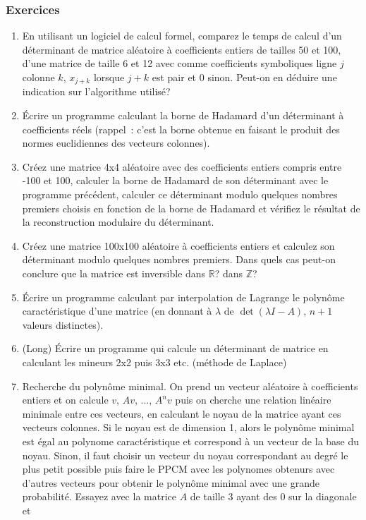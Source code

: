 \documentclass[a4paper,11pt]{article}
\newcommand{\R}{{\mathbb{R}}}
\newcommand{\Z}{{\mathbb{Z}}}
\begin{document}
\subsubsection{Exercices}
\begin{enumerate}
\item En utilisant un logiciel de calcul formel,
comparez le temps de calcul d'un d\'eterminant de matrice
al\'eatoire \`a coefficients entiers de tailles 50 et 100, 
d'une matrice de taille 6 et 12 avec comme coefficients symboliques
ligne $j$ colonne $k$, $x_{j+k}$ lorsque $j+k$ est pair
et 0 sinon. Peut-on en déduire une indication sur l'algorithme
utilisé?
\item \'Ecrire un programme calculant la borne de Hadamard d'un
déterminant à coefficients réels (rappel~: c'est la borne obtenue en faisant
le produit des normes euclidiennes des vecteurs colonnes).
\item Créez une matrice 4x4 aléatoire avec des coefficients entiers
compris entre -100 et 100, calculer la borne de Hadamard de son déterminant
avec le programme précédent, calculer ce déterminant modulo
quelques nombres premiers choisis en fonction de la borne de Hadamard
et vérifiez le résultat de la reconstruction modulaire du déterminant.
\item Créez une matrice 100x100 aléatoire à coefficients entiers
et calculez son déterminant
modulo quelques nombres premiers. Dans quels cas peut-on
conclure que la matrice est inversible dans $\R$? dans $\Z$?
\item \'Ecrire un programme calculant par interpolation de Lagrange
le polyn\^ome caract\'eristique d'une matrice (en donnant \`a $\lambda$
de $\det(\lambda I -A)$, $n+1$ valeurs distinctes).
\item (Long) \'Ecrire un programme qui calcule un d\'eterminant de matrice
en calculant les mineurs 2x2 puis 3x3 etc. (m\'ethode de Laplace)
\item Recherche du polynôme minimal. On prend un vecteur aléatoire
à coefficients entiers et on calcule $v$, $Av$, ..., $A^nv$ puis
on cherche une relation linéaire minimale entre ces vecteurs, en
calculant le noyau de la matrice ayant ces vecteurs colonnes. Si le
noyau est de dimension 1, alors le polynôme minimal est égal au
polynome caractéristique et correspond à un vecteur de la base du noyau.
Sinon, il faut choisir un vecteur du noyau correspondant au degré
le plus petit possible puis faire le PPCM avec les polynomes obtenurs
avec d'autres vecteurs pour obtenir le polynôme minimal avec une grande
probabilité.
Essayez avec la matrice $A$ de taille 3 ayant des 0 sur la diagonale et 

\end{enumerate}
\end{document}
